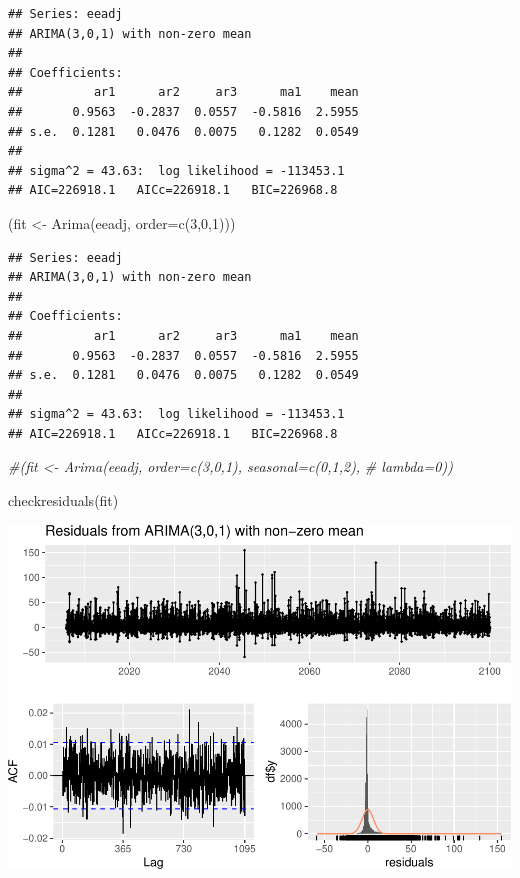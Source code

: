 \documentclass[
  paper=a4,
  ,captions=tableheading
]{scrartcl}
\newenvironment{Shaded}{\begin{snugshade}}{\end{snugshade}}
\newcommand{\AttributeTok}[1]{\textcolor[rgb]{0.77,0.63,0.00}{#1}}
\newcommand{\CommentTok}[1]{\textcolor[rgb]{0.56,0.35,0.01}{\textit{#1}}}
\newcommand{\DecValTok}[1]{\textcolor[rgb]{0.00,0.00,0.81}{#1}}
\newcommand{\FunctionTok}[1]{\textcolor[rgb]{0.00,0.00,0.00}{#1}}
\newcommand{\NormalTok}[1]{#1}
\newcommand{\OtherTok}[1]{\textcolor[rgb]{0.56,0.35,0.01}{#1}}
\begin{document}
\begin{verbatim}
## Series: eeadj 
## ARIMA(3,0,1) with non-zero mean 
## 
## Coefficients:
##          ar1      ar2     ar3      ma1    mean
##       0.9563  -0.2837  0.0557  -0.5816  2.5955
## s.e.  0.1281   0.0476  0.0075   0.1282  0.0549
## 
## sigma^2 = 43.63:  log likelihood = -113453.1
## AIC=226918.1   AICc=226918.1   BIC=226968.8
\end{verbatim}

\begin{Shaded}
\begin{Highlighting}[]
\NormalTok{(fit }\OtherTok{\textless{}{-}} \FunctionTok{Arima}\NormalTok{(eeadj, }\AttributeTok{order=}\FunctionTok{c}\NormalTok{(}\DecValTok{3}\NormalTok{,}\DecValTok{0}\NormalTok{,}\DecValTok{1}\NormalTok{)))}
\end{Highlighting}
\end{Shaded}

\begin{verbatim}
## Series: eeadj 
## ARIMA(3,0,1) with non-zero mean 
## 
## Coefficients:
##          ar1      ar2     ar3      ma1    mean
##       0.9563  -0.2837  0.0557  -0.5816  2.5955
## s.e.  0.1281   0.0476  0.0075   0.1282  0.0549
## 
## sigma^2 = 43.63:  log likelihood = -113453.1
## AIC=226918.1   AICc=226918.1   BIC=226968.8
\end{verbatim}

\begin{Shaded}
\begin{Highlighting}[]
\CommentTok{\#(fit \textless{}{-} Arima(eeadj, order=c(3,0,1), seasonal=c(0,1,2),}
\CommentTok{\#  lambda=0))}

\FunctionTok{checkresiduals}\NormalTok{(fit)}
\end{Highlighting}
\end{Shaded}

\includegraphics{Haskell_files/figure-latex/unnamed-chunk-89-1.pdf}
\end{document}
